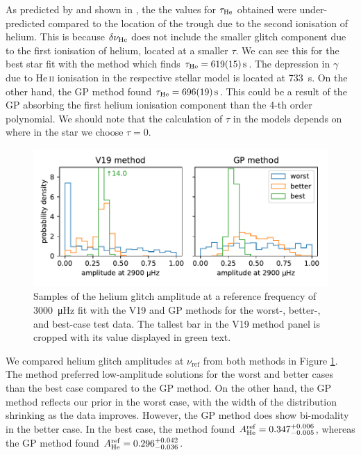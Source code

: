 As predicted by \citet{Houdek.Gough2007} and shown in \citet{Verma.Faria.ea2014}, the the values for \(\tau_\helium\) obtained were under-predicted compared to the location of the trough due to the second ionisation of helium. This is because \(\delta\nu_\helium\) does not include the smaller glitch component due to the first ionisation of helium, located at a smaller \(\tau\). We can see this for the best star fit with the  method which finds \(\tau_\helium = \SI{619(15)}{\second}\). The depression in \(\gamma\) due to He\,\textsc{ii} ionisation in the respective stellar model is located at \SI{733}{\second}. On the other hand, the GP method found \(\tau_\helium = \SI{696(19)}{\second}\). This could be a result of the GP absorbing the first helium ionisation component than the 4-th order polynomial. We should note that the calculation of \(\tau\) in the models depends on where in the star we choose \(\tau=0\).

\begin{figure}[!tb]
    \centering
    \includegraphics{figures/glitch-test-amplitude.pdf}
    \caption{Samples of the helium glitch amplitude at a reference frequency of \SI{3000}{\micro\hertz} fit with the V19 and GP methods for the worst-, better-, and best-case test data. The tallest bar in the V19 method panel is cropped with its value displayed in green text.}
    \label{fig:glitch-test-amplitude}
\end{figure}

We compared helium glitch amplitudes at \(\nu_\mathrm{ref}\) from both methods in Figure \ref{fig:glitch-test-amplitude}. The  method preferred low-amplitude solutions for the worst and better cases than the best case compared to the GP method. On the other hand, the GP method reflects our prior in the worst case, with the width of the distribution shrinking as the data improves. However, the GP method does show bi-modality in the better case. In the best case, the  method found \(A_\helium^\mathrm{ref} = 0.347_{-0.005}^{+0.006}\), whereas the GP method found \(A_\helium^\mathrm{ref} = 0.296_{-0.036}^{+0.042}\).

